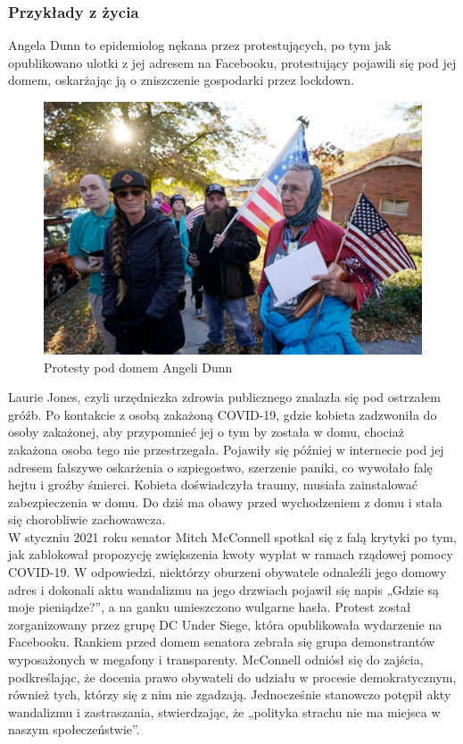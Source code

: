 \subsubsection{Przykłady z życia}
Angela Dunn to epidemiolog nękana przez protestujących, po tym jak opublikowano ulotki z jej adresem na Facebooku, protestujący pojawili się pod jej domem, oskarżając ją o zniszczenie gospodarki przez lockdown. 

\begin{figure}[H]
  \centering
  \includegraphics[width=1\textwidth]{images/lockdown.jpg}
  \caption{Protesty pod domem Angeli Dunn}
  \label{fig:lockdown}
\end{figure} 

Laurie Jones, czyli  urzędniczka zdrowia publicznego znalazła się pod ostrzałem gróźb. Po kontakcie z osobą zakażoną COVID-19, gdzie kobieta zadzwoniła do osoby zakażonej, aby przypomnieć jej o tym by została w domu, chociaż zakażona osoba tego nie przestrzegała. Pojawiły się później w internecie pod jej adresem fałszywe oskarżenia o szpiegostwo, szerzenie paniki, co wywołało falę hejtu i groźby śmierci.
Kobieta doświadczyła traumy, musiała zainstalować zabezpieczenia w domu. Do dziś ma obawy przed wychodzeniem z domu i stała się chorobliwie zachowawcza.\\

W styczniu 2021 roku senator Mitch McConnell spotkał się z falą krytyki po tym, jak zablokował propozycję zwiększenia kwoty wypłat w ramach rządowej pomocy COVID-19. W odpowiedzi, niektórzy oburzeni obywatele odnaleźli jego domowy adres i dokonali aktu wandalizmu na jego drzwiach pojawił się napis „Gdzie są moje pieniądze?”, a na ganku umieszczono wulgarne hasła.
Protest został zorganizowany przez grupę DC Under Siege, która opublikowała wydarzenie na Facebooku. Rankiem przed domem senatora zebrała się grupa demonstrantów wyposażonych w megafony i transparenty.
McConnell odniósł się do zajścia, podkreślając, że docenia prawo obywateli do udziału w procesie demokratycznym, również tych, którzy się z nim nie zgadzają. Jednocześnie stanowczo potępił akty wandalizmu i zastraszania, stwierdzając, że „polityka strachu nie ma miejsca w naszym społeczeństwie”.

